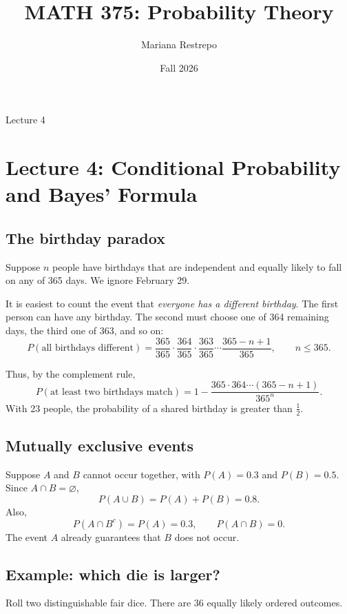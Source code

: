 \documentclass[11pt]{article}
\title{MATH 375: Probability Theory}
\author{Mariana Restrepo}
\date{Fall 2026}
\begin{document}
\maketitle

\begin{center}
\large Lecture 4
\end{center}

\tableofcontents

\section{Lecture 4: Conditional Probability and Bayes' Formula}

\subsection{The birthday paradox}

Suppose $n$ people have birthdays that are independent and equally
likely to fall on any of 365 days. We ignore February 29.

It is easiest to count the event that \emph{everyone has a different
birthday}. The first person can have any birthday. The second must
choose one of 364 remaining days, the third one of 363, and so on:
\[
P(\text{all birthdays different})
=
\frac{365}{365}
\cdot\frac{364}{365}
\cdot\frac{363}{365}
\cdots
\frac{365-n+1}{365},
\qquad n\leq365.
\]

Thus, by the complement rule,
\[
\boxed{
P(\text{at least two birthdays match})
=
1-
\frac{365\cdot364\cdots(365-n+1)}{365^n}.
}
\]
With 23 people, the probability of a shared birthday is greater
than $\tfrac12$.

\subsection{Mutually exclusive events}

Suppose $A$ and $B$ cannot occur together, with
$P(A)=0.3$ and $P(B)=0.5$. Since $A\cap B=\varnothing$,
\[
P(A\cup B)=P(A)+P(B)=0.8.
\]
Also,
\[
P(A\cap B^c)=P(A)=0.3,
\qquad
P(A\cap B)=0.
\]
The event $A$ already guarantees that $B$ does not occur.

\subsection{Example: which die is larger?}

Roll two distinguishable fair dice. There are $36$ equally likely
ordered outcomes.
\end{document}
